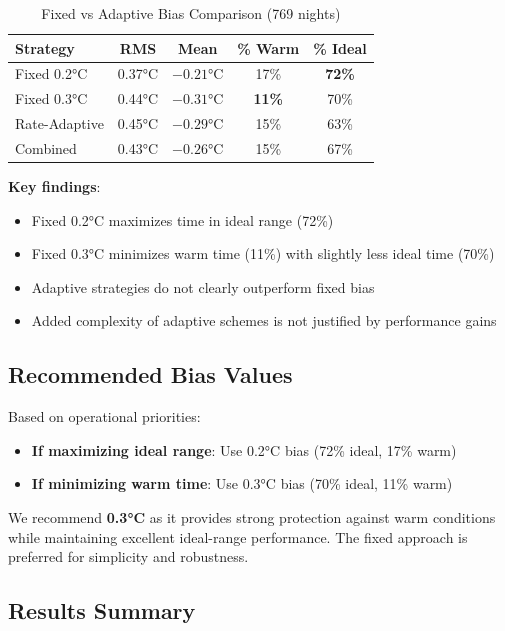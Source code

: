 \documentclass[11pt,letterpaper]{article}
\begin{document}
\begin{table}[H]
\centering
\caption{Fixed vs Adaptive Bias Comparison (769 nights)}
\label{tab:adaptive}
\begin{tabular}{l|cccc}
\toprule
\textbf{Strategy} & \textbf{RMS} & \textbf{Mean} & \textbf{\% Warm} & \textbf{\% Ideal} \\
\midrule
Fixed 0.2°C & 0.37°C & $-0.21$°C & 17\% & \textbf{72\%} \\
\rowcolor{bestcolor}
Fixed 0.3°C & 0.44°C & $-0.31$°C & \textbf{11\%} & 70\% \\
Rate-Adaptive & 0.45°C & $-0.29$°C & 15\% & 63\% \\
Combined & 0.43°C & $-0.26$°C & 15\% & 67\% \\
\bottomrule
\end{tabular}
\end{table}

\textbf{Key findings}:
\begin{itemize}
    \item Fixed 0.2°C maximizes time in ideal range (72\%)
    \item Fixed 0.3°C minimizes warm time (11\%) with slightly less ideal time (70\%)
    \item Adaptive strategies do not clearly outperform fixed bias
    \item Added complexity of adaptive schemes is not justified by performance gains
\end{itemize}

\subsection{Recommended Bias Values}

Based on operational priorities:
\begin{itemize}
    \item \textbf{If maximizing ideal range}: Use 0.2°C bias (72\% ideal, 17\% warm)
    \item \textbf{If minimizing warm time}: Use 0.3°C bias (70\% ideal, 11\% warm)
\end{itemize}

We recommend \textbf{0.3°C} as it provides strong protection against warm conditions while maintaining excellent ideal-range performance. The fixed approach is preferred for simplicity and robustness.

\subsection{Results Summary}
\end{document}
